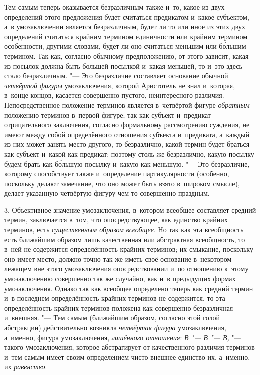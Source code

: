 Тем самым теперь оказывается безразличным также и~то, какое из
двух определений этого предложения будет считаться предикатом и~какое
субъектом, а~в умозаключении является безразличным, будет ли то или иное из
этих двух определений считаться крайним термином единичности или крайним
термином особенности, другими словами, будет ли оно считаться меньшим или
б\'{о}льшим термином. Так как, согласно обычному предположению, от этого
зависит, какая из посылок должна быть большей посылкой и~какая меньшей, то
и~это здесь стало безразличным. "--- Это безразличие составляет
основание обычной {\em четвёртой фигуры} умозаключения,
которой Аристотель не знал и~которая,
в~конце концов, касается совершенно пустого, неинтересного различия.
Непосредственное положение терминов является в~четвёртой фигуре
{\em обратным} положению
терминов в~первой фигуре; так как субъект и~предикат отрицательного
заключения, согласно формальному рассмотрению суждения, не имеют между
собой определённого отношения субъекта и~предиката, а~каждый из них может
занять место другого, то безразлично, какой термин будет браться как
субъект и~какой как предикат; поэтому столь же безразлично, какую посылку
будем брать как б\'{о}льшую посылку и~какую как меньшую. "---
Это безразличие, которому способствует также и~определение
партикулярности (особенно, поскольку делают замечание, что оно может быть
взято в~широком смысле), делает указанную четвёртую фигуру чем-то
совершенно праздным.

3. Объективное значение умозаключения, в~котором всеобщее
составляет средний термин, заключается в~том, что опосредствующее, как
единство крайних терминов, есть
{\em существенным образом всеобщее}.
Но так как эта всеобщность есть ближайшим образом лишь
качественная или абстрактная всеобщность, то в~ней не содержится
определённость крайних терминов; их смыкание, поскольку оно имеет место,
должно точно так же иметь своё основание в~некотором лежащем вне этого
умозаключения опосредствовании и~по отношению к~этому умозаключению
совершенно так же случайно, как и~в предыдущих формах умозаключения. Однако
так как всеобщее определено теперь как средний термин и~в последнем
определённость крайних терминов не содержится, то эта определённость
крайних терминов положена как совершенно безразличная и~внешняя. "---
Тем самым (ближайшим образом, согласно этой голой
абстракции) действительно возникла
{\em четвёртая фигура}
умозаключения, а~именно, фигура умозаключения,
{\em лишённого отношения}:
{\em В "--- В
"--- В,} "--- такого умозаключения, которое
абстрагирует от качественного различия терминов и~тем самым имеет своим
определением чисто внешнее единство их, а~именно, их
{\em равенство}.

